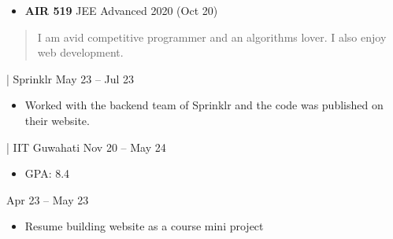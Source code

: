 \documentclass[10pt,a4paper,ragged2e,withhyper]{altacv}
\begin{document}
\begin{paracol}{2}
            \begin{itemize}
                \item {
                    \textbf{AIR 519} \newline
                    JEE Advanced 2020 (Oct 20)
                }
            \end{itemize}

            
        \newpage

        \switchcolumn
        
            \begin{quote}
                I am avid competitive programmer and an algorithms lover. I also enjoy web development.
            \end{quote}

                    {| Sprinklr}
                    {May 23 -- Jul 23}{}
                \begin{itemize}
                        \item Worked with the backend team of Sprinklr and the code was published on their website.
                \end{itemize}
                \divider
        
                    {| IIT Guwahati}
                    {Nov 20 -- May 24}{}
                \begin{itemize}
                    \item GPA: 8.4
                \end{itemize}
                \divider
        
                    {\cvreference{| \faGlobe}{}}
                    {Apr 23 -- May 23}{}
                \begin{itemize}
                        \item Resume building website as a course mini project
                \end{itemize}
                \divider
        

\end{paracol}
\end{document}
